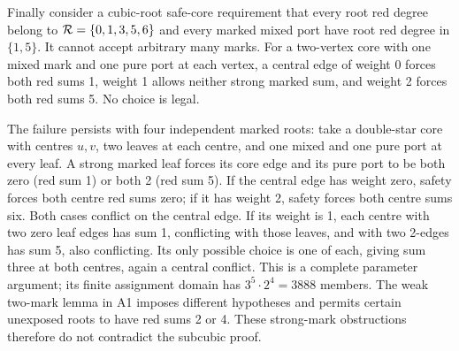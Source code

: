 Finally consider a cubic-root safe-core requirement that every root
red degree belong to $\mathcal R=\{0,1,3,5,6\}$ and every marked
mixed port have root red degree in $\{1,5\}$. It cannot accept
arbitrary many marks. For a two-vertex core with one mixed mark
and one pure port at each vertex, a central edge of weight 0 forces
both red sums 1, weight 1 allows neither strong marked sum, and
weight 2 forces both red sums 5. No choice is legal.

The failure persists with four independent marked roots: take a
double-star core with centres $u,v$, two leaves at each centre,
and one mixed and one pure port at every leaf. A strong marked leaf
forces its core edge and its pure port to be both zero (red sum 1)
or both 2 (red sum 5). If the central edge has weight zero, safety
forces both centre red sums zero; if it has weight 2, safety forces
both centre sums six. Both cases conflict on the central edge.
If its weight is 1, each centre with two zero leaf edges has sum
1, conflicting with those leaves, and with two 2-edges has sum 5,
also conflicting. Its only possible choice is one of each, giving
sum three at both centres, again a central conflict. This is a
complete parameter argument; its finite assignment domain has
$3^5\cdot2^4=3888$ members. The weak two-mark lemma in A1 imposes
different hypotheses and permits certain unexposed roots to have
red sums 2 or 4. These strong-mark obstructions therefore do not
contradict the subcubic proof.
